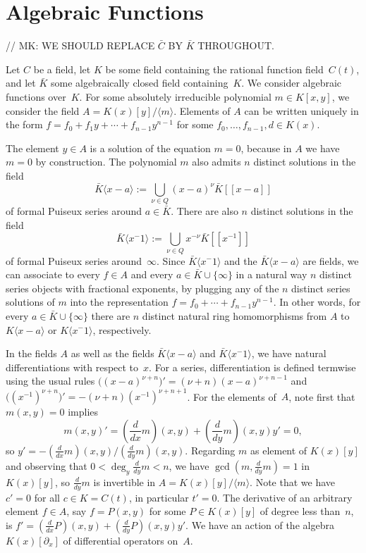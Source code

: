 \documentclass{sig-alternate}
\def\<#1>{\langle#1\rangle}
\begin{document}
\section{Algebraic Functions}

// MK: WE SHOULD REPLACE $\bar C$ BY $\bar K$ THROUGHOUT.

Let $C$ be a field, let $K$ be some field containing the rational function 
field~$C(t)$, and let $\bar K$ some algebraically closed field containing~$K$.  We
consider algebraic functions over~$K$.  For some absolutely irreducible
polynomial $m\in K[x,y]$, we consider the field
$A=K(x)[y]/\<m>$. Elements of $A$ can be written uniquely in the form
$f=f_0+f_1y+\cdots+f_{n-1}y^{n-1}$ for some $f_0,\dots,f_{n-1},d\in K(x)$.

The element $y\in A$ is a solution of the equation $m=0$, 
because in $A$ we have $m=0$ by construction. The polynomial $m$ also admits 
$n$ distinct solutions in the field
\[
  \bar K\<x-a>:=\bigcup_{\nu\in Q} (x-a)^\nu\bar K[[x-a]]
\]
of formal Puiseux series around $a\in\bar K$. There are also $n$ distinct 
solutions in the field 
\[
  \bar K\<x^{-1}>:=\bigcup_{\nu\in Q} x^{-\nu}\bar K[[x^{-1}]]
\]
of formal Puiseux series around~$\infty$. 
Since $\bar K\<x^{-1}>$ and the $\bar K\<x-a>$ are fields, we can associate to every 
$f\in A$ and every $a\in\bar K\cup\{\infty\}$ in a natural way $n$ distinct series 
objects with fractional exponents, by plugging any of the $n$ distinct series solutions
of $m$ into the representation $f=f_0+\cdots+f_{n-1}y^{n-1}$. 
In other words, for every $a\in\bar K\cup\{\infty\}$ there are $n$ distinct natural
ring homomorphisms from $A$ to $K\<x-a>$ or $K\<x^{-1}>$, respectively. 

In the fields $A$ as well as the fields $\bar K\<x-a>$ and $\bar K\<x^{-1}>$, we have
natural differentiations with respect to~$x$. For a series, differentiation is defined
termwise using the usual rules $\bigl((x-a)^{\nu+n}\bigr)'=(\nu+n)(x-a)^{\nu+n-1}$ and
$\bigl((x^{-1})^{\nu+n}\bigr)'=-(\nu+n)(x^{-1})^{\nu+n+1}$. For the elements of~$A$, note 
first that $m(x,y)=0$ implies 
\[m(x,y)'=(\frac d{dx}m)(x,y) + (\frac d{dy}m)(x,y)y' = 0,\] 
so $y'=-(\frac d{dx}m)(x,y)/(\frac d{dy}m)(x,y)$. Regarding $m$ as element of $K(x)[y]$
and observing that $0<\deg_y\frac d{dy}m<n$, we have $\gcd(m,\frac d{dy}m)=1$ in $K(x)[y]$, 
so $\frac{d}{dy}m$ is invertible in $A=K(x)[y]/\<m>$. 
Note that we have $c'=0$ for all $c\in K=C(t)$, in particular $t'=0$. 
The derivative of an arbitrary 
element $f\in A$, say $f=P(x,y)$ for some $P\in K(x)[y]$ of degree less than~$n$, is
$f'=(\frac{d}{dx}P)(x,y)+(\frac d{dy}P)(x,y)y'$. 
We have an action of the algebra $K(x)[\partial_x]$ of differential operators on~$A$. 
\end{document}
